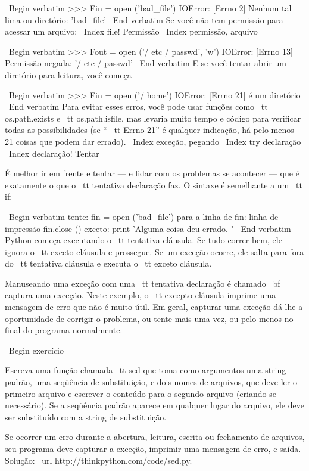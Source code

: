 \documentclass[10pt]{book}
\begin{document}
{{{{{{{{{{\ Begin {verbatim}
>>> Fin = open ('bad_file')
IOError: [Errno 2] Nenhum tal lima ou diretório: 'bad_file'
\ End {verbatim}
%
Se você não tem permissão para acessar um arquivo:
\ Index {file! Permissão}
\ Index {permissão, arquivo}

\ Begin {verbatim}
>>> Fout = open ('/ etc / passwd', 'w')
IOError: [Errno 13] Permissão negada: '/ etc / passwd'
\ End {verbatim}
%
E se você tentar abrir um diretório para leitura, você começa

\ Begin {verbatim}
>>> Fin = open ('/ home')
IOError: [Errno 21] é um diretório
\ End {verbatim}
%
Para evitar esses erros, você pode usar funções como {\ tt os.path.exists}
e {\ tt os.path.isfile}, mas levaria muito tempo e código
para verificar todas as possibilidades (se `` {\ tt Errno 21}'' é qualquer
indicação, há pelo menos 21 coisas que podem dar errado).
\ Index {exceção, pegando}
\ Index {try declaração}
\ Index {declaração! Tentar}

É melhor ir em frente e tentar --- e lidar com os problemas se
acontecer --- que é exatamente o que o {\ tt tentativa} declaração faz. O
sintaxe é semelhante a um {\ tt if}:

\ Begin {verbatim}
tente:    
    fin = open ('bad_file')
    para a linha de fin:
        linha de impressão
    fin.close ()
exceto:
    print 'Alguma coisa deu errado. "
\ End {verbatim}
%
Python começa executando o {\ tt tentativa} cláusula. Se tudo correr
bem, ele ignora o {\ tt exceto} cláusula e prossegue. Se um
exceção ocorre, ele salta para fora do {\ tt tentativa} cláusula e
executa o {\ tt exceto} cláusula.

Manuseando uma exceção com uma {\ tt tentativa} declaração é chamado {\ bf
captura} uma exceção. Neste exemplo, o {\ tt excepto} cláusula
imprime uma mensagem de erro que não é muito útil. Em geral,
capturar uma exceção dá-lhe a oportunidade de corrigir o problema, ou tente
mais uma vez, ou pelo menos no final do programa normalmente.

\ Begin {} exercício

Escreva uma função chamada {\ tt sed} que toma como argumentos uma string padrão,
uma seqüência de substituição, e dois nomes de arquivos, que deve ler o primeiro arquivo
e escrever o conteúdo para o segundo arquivo (criando-se
necessário). Se a seqüência padrão aparece em qualquer lugar do arquivo, ele
deve ser substituído com a string de substituição.

Se ocorrer um erro durante a abertura, leitura, escrita ou fechamento de arquivos,
seu programa deve capturar a exceção, imprimir uma mensagem de erro, e
saída. Solução: \ url {http://thinkpython.com/code/sed.py}.

}}}}}}}}}}
\end{document}
